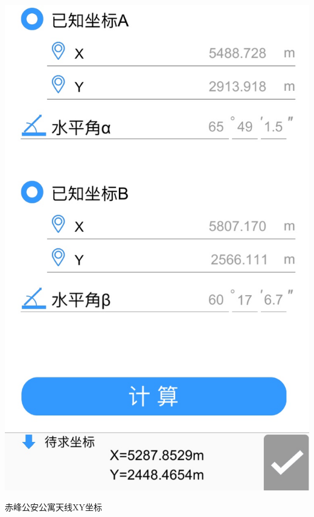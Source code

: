 \documentclass[a4paper,16pt,UTF8]{article}
\begin{document}
\begin{center}
    

    \includegraphics[scale = 0.45]{iifg.jpg}

    赤峰公安公寓天线XY坐标
    

\end{center}
\end{document}
